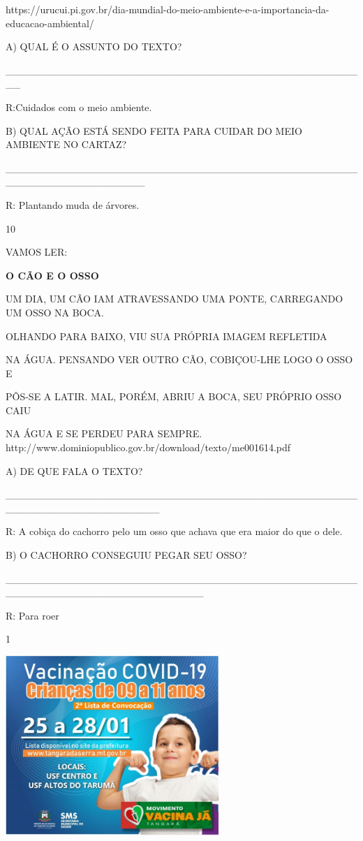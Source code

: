 {{{{{https://urucui.pi.gov.br/dia-mundial-do-meio-ambiente-e-a-importancia-da-educacao-ambiental/

A) QUAL É O ASSUNTO DO TEXTO?

\_\_\_\_\_\_\_\_\_\_\_\_\_\_\_\_\_\_\_\_\_\_\_\_\_\_\_\_\_\_\_\_\_\_\_\_\_\_\_\_\_\_\_\_\_\_\_\_\_\_

R:Cuidados com o meio ambiente.

B) QUAL AÇÃO ESTÁ SENDO FEITA PARA CUIDAR DO MEIO AMBIENTE NO CARTAZ?

\_\_\_\_\_\_\_\_\_\_\_\_\_\_\_\_\_\_\_\_\_\_\_\_\_\_\_\_\_\_\_\_\_\_\_\_\_\_\_\_\_\_\_\_\_\_\_\_\_\_\_\_\_\_\_\_\_\_\_\_\_\_\_\_\_\_\_

R: Plantando muda de árvores.

\num{10}

VAMOS LER:

\textbf{O CÃO E O OSSO}

UM DIA, UM CÃO IAM ATRAVESSANDO UMA PONTE, CARREGANDO UM OSSO NA BOCA.

OLHANDO PARA BAIXO, VIU SUA PRÓPRIA IMAGEM REFLETIDA

NA ÁGUA. PENSANDO VER OUTRO CÃO, COBIÇOU-LHE LOGO O OSSO E

PÔS-SE A LATIR. MAL, PORÉM, ABRIU A BOCA, SEU PRÓPRIO OSSO CAIU

NA ÁGUA E SE PERDEU PARA SEMPRE.
http://www.dominiopublico.gov.br/download/texto/me001614.pdf

A) DE QUE FALA O TEXTO?

\_\_\_\_\_\_\_\_\_\_\_\_\_\_\_\_\_\_\_\_\_\_\_\_\_\_\_\_\_\_\_\_\_\_\_\_\_\_\_\_\_\_\_\_\_\_\_\_\_\_\_\_\_\_\_\_\_\_\_\_\_\_\_\_\_\_\_\_\_

R: A cobiça do cachorro pelo um osso que achava que era maior do que o
dele.

B) O CACHORRO CONSEGUIU PEGAR SEU OSSO?

\_\_\_\_\_\_\_\_\_\_\_\_\_\_\_\_\_\_\_\_\_\_\_\_\_\_\_\_\_\_\_\_\_\_\_\_\_\_\_\_\_\_\_\_\_\_\_\_\_\_\_\_\_\_\_\_\_\_\_\_\_\_\_\_\_\_\_\_\_\_\_\_\_\_\_

R: Para roer


\num{1}

\includegraphics[width=3.17910in,height=2.68418in]{media/image124.jpeg}

}}}}}
